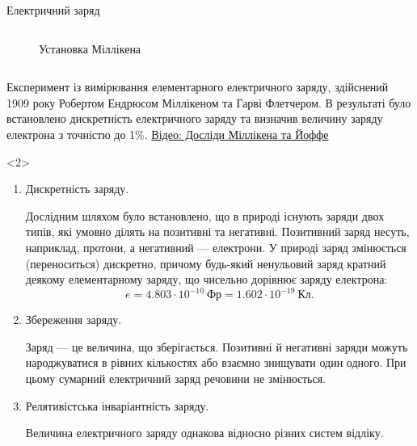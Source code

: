 \documentclass{beamer}
\begin{document}
\begin{frame}{Електричний заряд}
\begin{onlyenv}
\begin{columns}
\begin{column}{0.4\linewidth}
\begin{figure}
					\caption{Установка Міллікена}
				\end{figure}
			\end{column}
		\end{columns}
		\begin{block}{}\justifying
			Експеримент із вимірювання елементарного електричного заряду,
			здійснений 1909 року Робертом Ендрюсом Міллікеном та Гарві
			Флетчером. В результаті було встановлено дискретність електричного
			заряду та визначив величину заряду електрона з точністю до 1\%.
			\href{https://www.youtube.com/watch?v=5LC4-ct_1-M}{Відео: Досліди Міллікена та Йоффе}
		\end{block}
	\end{onlyenv}

	\begin{onlyenv}
		\begin{enumerate}\justifying
			\item Дискретність заряду.

			      \begin{flushleft}\small
				      Дослідним шляхом було встановлено, що в природі існують \alert{заряди двох типів}, які умовно ділять на \alert{позитивні} та
				      \alert{негативні}. Позитивний заряд несуть, наприклад, протони, а негативний --- електрони. У природі заряд змінюється (переноситься)
				      дискретно, причому будь-який ненульовий заряд кратний деякому елементарному заряду, що чисельно дорівнює заряду електрона:
				      \begin{equation*}
					      e = 4.803 \cdot 10^{-10}\ \text{Фр} = 1.602 \cdot 10^{-19}\ \text{Кл}.
				      \end{equation*}
			      \end{flushleft}

			\item Збереження заряду.

			      \begin{flushleft}\small
				      Заряд --- це величина, що \alert{зберігається}. Позитивні й негативні заряди можуть народжуватися в рівних кількостях або взаємно
				      знищувати один одного. При цьому сумарний електричний заряд речовини не змінюється.
			      \end{flushleft}
			\item Релятивістська інваріантність заряду.

			      \begin{flushleft}\small
				      Величина електричного заряду однакова відносно різних систем відліку.
			      \end{flushleft}
		\end{enumerate}
	\end{onlyenv}
\end{frame}
\end{document}
